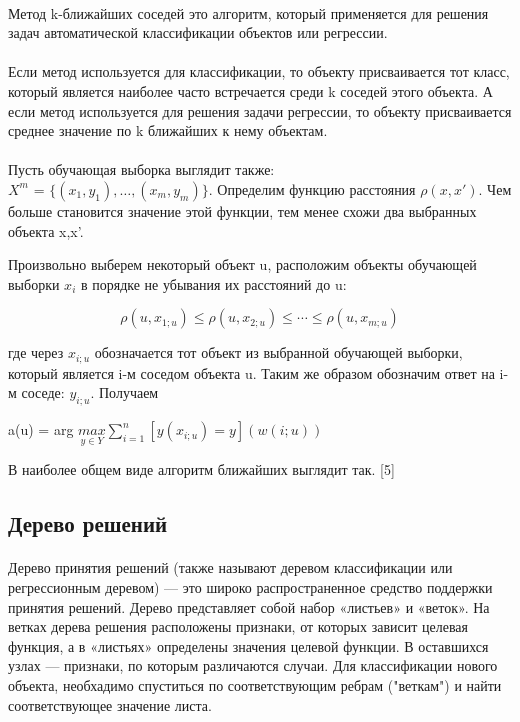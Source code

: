 \documentclass{article}
\begin{document}
	\paragraph{}
	Метод k-ближайших соседей это алгоритм, который применяется для решения задач автоматической классификации объектов или регрессии.
	\paragraph{}
	Если метод используется для классификации, то объекту присваивается тот класс, который является наиболее часто встречается среди k соседей этого объекта. А если метод используется для решения задачи регрессии, то объекту присваивается среднее значение по k ближайших к нему объектам.
	\paragraph{}
	Пусть обучающая выборка выглядит также: \\$X^m$ = $\{(x_1,y_1),\dots,(x_m,y_m)\}$.
	Определим функцию расстояния $\rho(x,x')$. Чем больше становится значение этой функции, тем менее схожи два выбранных объекта x,x'.
	
	Произвольно выберем некоторый объект u, расположим объекты обучающей выборки $x_i$ в порядке не убывания их расстояний до u:
	
	\[\rho(u,x_{1; u})\leq  \rho(u,x_{2; u}) \leq \cdots \leq \rho(u,x_{m; u})\]
	
	где через $x_{i; u}$ обозначается тот объект из выбранной обучающей выборки, который является i-м соседом объекта u. Таким же образом обозначим ответ на i-м соседе: $y_{i; u}$. Получаем
	\begin{center}
		a(u) = arg $\underset{y\in Y}{max}\sum\limits_{i=1}^n[y(x_{i;u})=y](w(i;u))$
	\end{center} 
	В наиболее общем виде алгоритм ближайших выглядит так. [5]
	\subsection{Дерево решений}
	\paragraph{}
	Дерево принятия решений (также называют деревом классификации или регрессионным деревом) — это широко распространенное средство поддержки принятия решений. Дерево представляет собой набор  «листьев» и «веток». На ветках дерева решения расположены признаки, от которых зависит целевая функция, а  в «листьях» определены значения целевой функции. В оставшихся узлах — признаки, по которым различаются случаи. Для классификации нового объекта, необхадимо спуститься по соответствующим ребрам ("веткам") и найти соответствующее значение листа.
\end{document}
